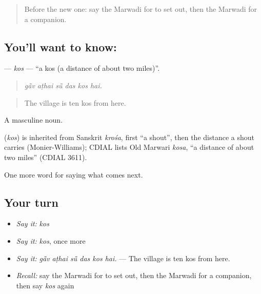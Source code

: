 \label{lesson:MW-C216-kos}



\begin{quote}
Before the new one: say the Marwadi for to set out, then the Marwadi for a companion.
\end{quote}

\subsection*{You'll want to know: }
\textbf{} — \emph{kos} — \textquotedblleft{}a kos (a distance of about two miles)\textquotedblright{}.

\begin{quote}
     
\end{quote}

\begin{quote}
\emph{gā̃v aṭhai sū̃ das kos hai.}
\end{quote}

\begin{quote}
The village is ten kos from here.
\end{quote}

A masculine noun.

\begin{cousinweb}
\textbf{} (\emph{kos}) is inherited from Sanskrit \emph{krośa}, first \textquotedblleft{}a shout\textquotedblright{}, then the distance a shout carries (Monier-Williams); CDIAL lists Old Marwari \emph{kosa}, \textquotedblleft{}a distance of about two miles\textquotedblright{} (CDIAL 3611).
\end{cousinweb}

\begin{grammarlens}[title={What you've built}]
One more word for saying what comes next.
\end{grammarlens}

\subsection*{Your turn}
\begin{itemize}
\raggedright
  \item \emph{Say it:} \emph{kos}
  \item \emph{Say it:} \emph{kos}, once more
  \item \emph{Say it:} \emph{gā̃v aṭhai sū̃ das kos hai.} — The village is ten kos from here.
  \item \emph{Recall:} say the Marwadi for to set out, then the Marwadi for a companion, then say \emph{kos} again
\end{itemize}

